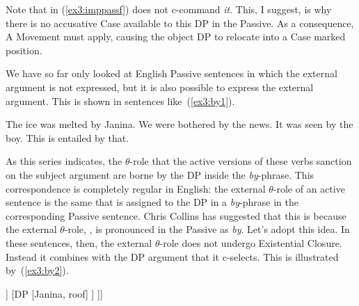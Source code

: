 Note that in (\ref{ex3:imppassf})  does not c-command \emph{it}. This, I suggest, is why there is no accusative Case available to this DP in the Passive. As a consequence, A Movement must apply, causing the object DP to relocate into a Case marked position. 

We have so far only looked at English Passive sentences in which the external argument is not expressed, but it is also possible to express the external argument. This is shown in sentences like~(\ref{ex3:by1}).
\begin{exe}
	\raggedright
	\ex \label{ex3:by1} 
	\begin{xlist}
		\ex The ice was melted by Janina.
		\ex We were bothered by the news.
		\ex It was seen by the boy.
		\ex This is entailed by that.
	\end{xlist}
\end{exe}
As this series indicates, the $\theta$-role that the active versions of these verbs sanction on the subject argument are borne by the DP inside the \emph{by}-phrase. This correspondence is completely regular in English: the external $\theta$-role of an active sentence is the same that is assigned to the DP in a \emph{by}-phrase in the corresponding Passive sentence. Chris Collins\cite{Collins:2005a} has suggested that this is because the external $\theta$-role, , is pronounced in the Passive as \emph{by}. Let's adopt this idea. In these sentences, then, the external $\theta$-role does not undergo Existential Closure. Instead it combines with the DP argument that it c-selects. This is illustrated by~(\ref{ex3:by2}).
\begin{exe}
	\raggedright
	\ex \label{ex3:by2} 
	\small
	\begin{forest}
	[$\lambda P$ $\lambda \epsilon$ \textsc{agent}(\denotes{Janina})($\epsilon$)\\ vP [$\lambda P$ $\lambda \epsilon$ \textsc{agent}(\denotes{Janina})($\epsilon$)\\ \ibar{v}
		[$\lambda x$ $\lambda P$ $\lambda \epsilon$ \textsc{agent}($x$)($\epsilon$)\\ \obar{v} [\textsc{pass}(agent)] ]
		[DP [Janina, roof] ]
	]]
	\end{forest}
\end{exe}
